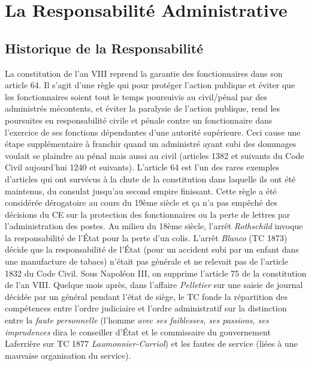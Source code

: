\documentclass[math]{cours}
\begin{document}
\section{La Responsabilité Administrative}
\subsection{Historique de la Responsabilité}
La constitution de l'an VIII reprend la garantie des fonctionnaires dans son article 64. Il s'agit d'une règle qui pour protéger l'action publique et éviter que les fonctionnaires soient tout le temps poursuivis au civil/pénal par des administrés mécontents,
et éviter la paralysie de l'action publique, rend les poursuites en responsabilité civile et pénale contre un fonctionnaire dans l'exercice de ses fonctions dépendantes d'une autorité supérieure.
Ceci cause une étape supplémentaire à franchir quand un administré ayant subi des dommages voulait se plaindre au pénal mais aussi au civil (articles 1382 et suivants du Code Civil aujourd'hui 1240 et suivants).
L'article 64 est l'un des rares exemples d'articles qui ont survécus à la chute de la constitution dans laquelle ils ont été maintenus, du consulat jusqu'au second empire finissant.
Cette règle a été considérée dérogatoire au cours du 19ème siècle et ça n'a pas empêché des décisions du CE sur la protection des fonctionnaires ou la perte de lettres par l'administration des postes.
Au milieu du 18ème siècle, l'arrêt \emph{Rothschild} invoque la responsabilité de l'État pour la perte d'un colis.
L'arrêt \emph{Blanco} (TC 1873) décide que la responsabilité de l'État (pour un accident subi par un enfant dans une manufacture de tabacs) n'était pas générale et ne relevait pas de l'article 1832 du Code Civil.
Sous Napoléon III, on supprime l'article 75 de la constitution de l'an VIII.
Quelque mois après, dans l'affaire \emph{Pelletier} sur une saisie de journal décidée par un général pendant l'état de siège, le TC fonde la répartition des compétences entre l'ordre judiciaire et l'ordre administratif sur la distinction entre la \emph{faute personnelle} (l'homme \emph{avec ses faiblesses, ses passions, ses imprudences} dira le conseiller d'État et le commissaire du gouvernement Laferrière sur TC 1877 \emph{Laumonnier-Carriol}) et les fautes de service (liées à une mauvaise organisation du service).
\end{document}
